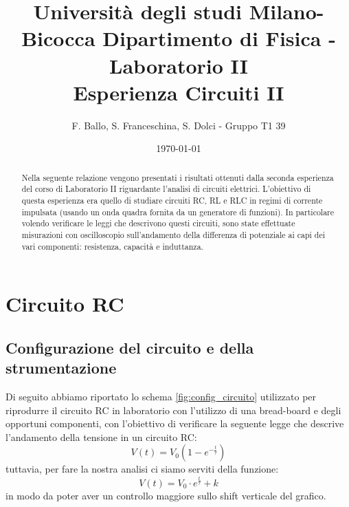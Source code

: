 \documentclass[letterpaper,12pt]{article}
\begin{document}
\title{{\small Università degli studi Milano-Bicocca  Dipartimento di Fisica - Laboratorio II }\\
    Esperienza Circuiti II}
\author{F. Ballo, S. Franceschina, S. Dolci - Gruppo T1 39}
\date{\today}
\maketitle
\thispagestyle{logoheader}


\begin{abstract}
Nella seguente relazione vengono presentati i risultati ottenuti dalla seconda esperienza del corso di Laboratorio II riguardante l'analisi di circuiti elettrici. L'obiettivo di questa esperienza era quello di studiare circuiti RC, RL e RLC in regimi di corrente impulsata (usando un onda quadra fornita da un generatore di funzioni). In particolare volendo verificare le leggi che descrivono questi circuiti, sono state effettuate misurazioni con oscilloscopio sull'andamento della differenza di potenziale ai capi dei vari componenti: resistenza, capacità e induttanza.

\begin{adjustwidth}{-1cm}{-1cm}


\end{adjustwidth}
\end{abstract}
\tableofcontents
\newpage

\section{Circuito RC}

\subsection{Configurazione del circuito e della strumentazione}
Di seguito abbiamo riportato lo schema \ref{fig:config_circuito} utilizzato per riprodurre il circuito RC in laboratorio con l'utilizzo di una bread-board e degli opportuni componenti, con l'obiettivo di verificare la seguente legge che descrive l'andamento della tensione in un circuito RC:
\begin{equation}
\label{eq: Modello esponenziale}
    V(t) = V_0 \left(1  -e^{-\frac{t}{\tau}}\right) 
\end{equation}
tuttavia, per fare la nostra analisi ci siamo serviti della funzione:
\begin{equation}
    \label{eq: Modello esponenziale modificato}
    V(t) = V_0 \cdot e^{\frac{t}{\tau}} + k
\end{equation}
in modo da poter aver un controllo maggiore sullo shift verticale del grafico.
\end{document}

